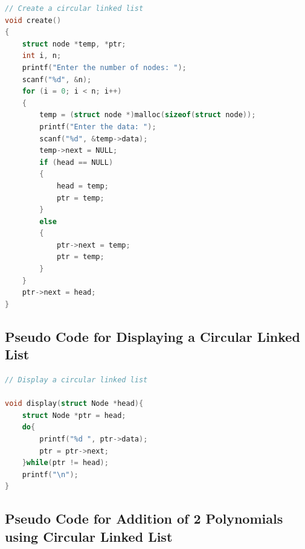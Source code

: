 \documentclass[11pt]{article}
\begin{document}
\begin{lstlisting}[language=C]
// Create a circular linked list
void create()
{
	struct node *temp, *ptr;
	int i, n;
	printf("Enter the number of nodes: ");
	scanf("%d", &n);
	for (i = 0; i < n; i++)
	{
		temp = (struct node *)malloc(sizeof(struct node));
		printf("Enter the data: ");
		scanf("%d", &temp->data);
		temp->next = NULL;
		if (head == NULL)
		{
			head = temp;
			ptr = temp;
		}
		else
		{
			ptr->next = temp;
			ptr = temp;
		}
	}
	ptr->next = head;
}

\end{lstlisting}
\subsection{Pseudo Code for Displaying a Circular Linked List}
\begin{lstlisting}[language=C]
// Display a circular linked list

void display(struct Node *head){
	struct Node *ptr = head;
	do{
		printf("%d ", ptr->data);
		ptr = ptr->next;
	}while(ptr != head);
	printf("\n");
}

\end{lstlisting}
\subsection{Pseudo Code for Addition of 2 Polynomials using Circular Linked List}
\end{document}

